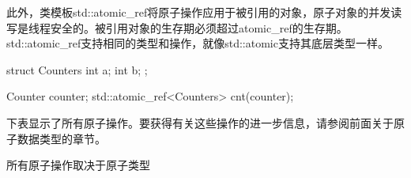 
此外，类模板std::atomic\_ref将原子操作应用于被引用的对象，原子对象的并发读写是线程安全的。被引用对象的生存期必须超过atomic\_ref的生存期。std::atomic\_ref支持相同的类型和操作，就像std::atomic支持其底层类型一样。

\begin{cpp}
struct Counters {
	int a;
	int b;
};

Counter counter;
std::atomic_ref<Counters> cnt(counter);
\end{cpp}


下表显示了所有原子操作。要获得有关这些操作的进一步信息，请参阅前面关于原子数据类型的章节。

\begin{center}
所有原子操作取决于原子类型
\end{center}

